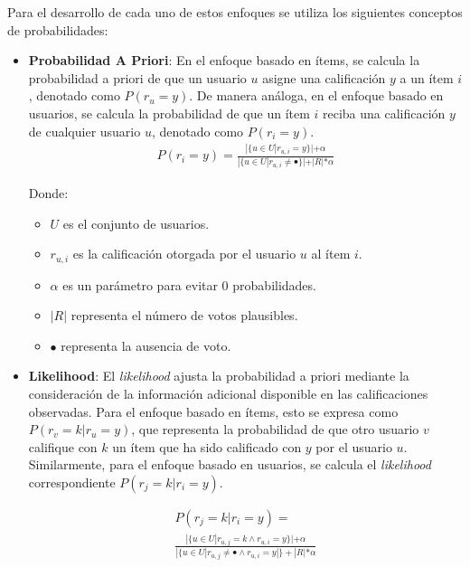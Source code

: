 \documentclass[twocolumn, fontsize=10pt]{article}
\begin{document}
Para el desarrollo de cada uno de estos enfoques se 
utiliza los siguientes conceptos de probabilidades:

\begin{itemize}
    \item \textbf{Probabilidad A Priori}: 
    En el enfoque basado en ítems, se calcula la 
    probabilidad a priori de que un usuario $u$ asigne 
    una calificación $y$ a un ítem $i$, 
    denotado como $P(r_u = y)$. De manera análoga, 
    en el enfoque basado en usuarios, se calcula la 
    probabilidad de que un ítem $i$ reciba una 
    calificación $y$ de cualquier usuario $u$, 
    denotado como $P (r_i = y)$.\\

    \begin{multline}
        P(r_i = y) = \frac{|\{u \in U|r_{u,i} = y\}| + \alpha}{|\{u \in U|r_{u,i} \neq \bullet\}| + |R|*\alpha}
    \end{multline} \cite{tesis_sistema_recomendador_hibrido}

    Donde:
    \begin{itemize}
        \item $U$ es el conjunto de usuarios.
        \item $r_{u,i}$ es la calificación otorgada por el usuario $u$ al ítem $i$.
        \item $\alpha$ es un parámetro para evitar 0 probabilidades.
        \item $|R|$ representa el número de votos plausibles.
        \item $\bullet$ representa la ausencia de voto.
    \end{itemize} 

    
    \item \textbf{Likelihood}: 
    El \textit{likelihood} ajusta la probabilidad a 
    priori mediante la consideración de la 
    información adicional disponible en las 
    calificaciones observadas. Para el enfoque basado 
    en ítems, esto se expresa como 
    $P(r_v = k | r_u = y)$, que representa la 
    probabilidad de que otro usuario $v$ califique 
    con $k$ un ítem que ha sido calificado con $y$ 
    por el usuario $u$. Similarmente, para el enfoque 
    basado en usuarios, se calcula el \textit{likelihood} 
    correspondiente $P(r_j = k|r_i = y)$.

    \begin{multline}
        P(r_j = k|r_i = y) =  \\ \frac{|\{u \in U|r_{u,j} = k  \land  r_{u,i} = y\}|+ \alpha}{|\{u \in U|r_{u,j} \neq \bullet \land r_{u,i} = y|\} + |R|*\alpha}
    \end{multline} \cite{tesis_sistema_recomendador_hibrido}



\end{itemize}
\end{document}
